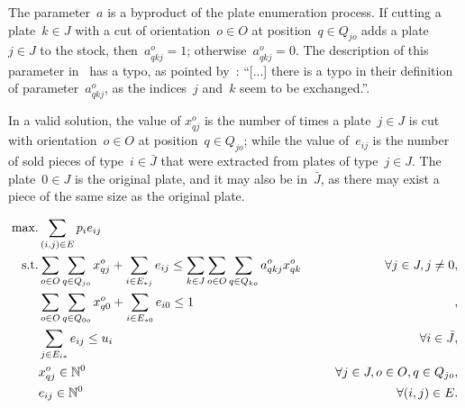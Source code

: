 \documentclass[smallextended]{svjour3}       %
\begin{document}
The parameter~\(a\) is a byproduct of the plate enumeration process.
If cutting a plate~\(k \in J\) with a cut of orientation~\(o \in O\) at position~\(q \in Q_{jo}\) adds a plate~\(j \in J\) to the stock, then~\(a^o_{qkj} = 1\); otherwise~\(a^o_{qkj} = 0\).
The description of this parameter in~\cite{furini:2016} has a typo, as pointed by~\cite{martin:2020}:
``[...] there is a typo in their definition of parameter~\(a^o_{qkj}\), as the indices~\(j\) and~\(k\) seem to be exchanged.''.

In a valid solution, the value of \(x^o_{qj}\) is the number of times a plate~\(j \in J\) is cut with orientation~\(o \in O\) at position~\(q \in Q_{jo}\); while the value of~\(e_{ij}\) is the number of sold pieces of type~\(i \in \bar{J}\) that were extracted from plates of type~\(j \in J\).
The plate~\(0 \in J\) is the original plate, and it may also be in~\(\bar{J}\), as there may exist a piece of the same size as the original plate.

\begin{align}
\mbox{max.} &\sum_{(i, j) \in E} p_i e_{ij} \label{eq:objfun}\\
\mbox{s.t.} &\sum_{o \in O}\sum_{q \in Q_{jo}} x^o_{qj} + \sum_{i \in E_{*j}} e_{ij} \leq \sum_{k \in J}\sum_{o \in O}\sum_{q \in Q_{ko}} a^o_{qkj} x^o_{qk} \hspace*{0.05\textwidth} & \forall j \in J, j \neq 0,\label{eq:plates_conservation}\\
	& \sum_{o \in O}\sum_{q \in Q_{0o}} x^o_{q0} + \sum_{i \in E_{*0}} e_{i0} \leq 1 &,\label{eq:just_one_original_plate}\\
	& \sum_{j \in E_{i*}} e_{ij} \leq u_i & \forall i \in \bar{J},\label{eq:demand_limit}\\
	& x^o_{qj} \in \mathbb{N}^0 & \forall j \in J, o \in O, q \in Q_{jo},\label{eq:trivial_x}\\
	& e_{ij} \in \mathbb{N}^0 & \forall (i, j) \in E.\label{eq:trivial_e}
\end{align}
\end{document}
